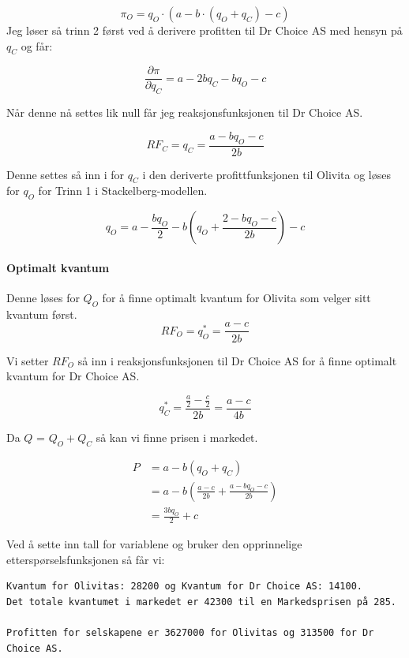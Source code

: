 \documentclass[
  12pt,
  a4paper,
  DIV=11,
  numbers=noendperiod]{scrartcl}
\let\oldparagraph\paragraph
\renewcommand{\paragraph}[1]{\oldparagraph{#1}\mbox{}}
\begin{document}
\[
\pi_O = q_O \cdot (a - b \cdot (q_O + q_C) - c) 
\] Jeg løser så trinn 2 først ved å derivere profitten til Dr Choice AS
med hensyn på \(q_C\) og får:

\[
\frac{\partial \pi}{\partial q_C} = a- 2bq_C - bq_O -c
\]

Når denne nå settes lik null får jeg reaksjonsfunksjonen til Dr Choice
AS.

\[
RF_C = q_C= \frac{a-bq_O - c}{2b}
\]

Denne settes så inn i for \(q_C\) i den deriverte profittfunksjonen til
Olivita og løses for \(q_O\) for Trinn 1 i Stackelberg-modellen.

\[
q_O = a-\frac{b q_O}{2} - b \left(q_O + \frac{2-b q_O - c}{2b}\right)-c
\]

\paragraph{Optimalt kvantum}\label{optimalt-kvantum}

Denne løses for \(Q_O\) for å finne optimalt kvantum for Olivita som
velger sitt kvantum først. \[
RF_O = q_O^* = \frac{a-c}{2b}
\]

Vi setter \(RF_O\) så inn i reaksjonsfunksjonen til Dr Choice AS for å
finne optimalt kvantum for Dr Choice AS.

\[
q_C^* = \frac{\frac{a}{2}-\frac{c}{2}}{2b} = \frac{a-c}{4b}
\]

Da \(Q\) = \(Q_O + Q_C\) så kan vi finne prisen i markedet.

\begin{align*}
P &= a - b(q_O + q_C) \\
&= a- b \left(\frac{a-c}{2b} + \frac{a- bq_O - c}{2b} \right) \\
&= \frac{3b q_O}{2} + c
\end{align*}

Ved å sette inn tall for variablene og bruker den opprinnelige
etterspørselsfunksjonen så får vi:

\begin{verbatim}
Kvantum for Olivitas: 28200 og Kvantum for Dr Choice AS: 14100. 
Det totale kvantumet i markedet er 42300 til en Markedsprisen på 285.

Profitten for selskapene er 3627000 for Olivitas og 313500 for Dr Choice AS.
\end{verbatim}
\end{document}
